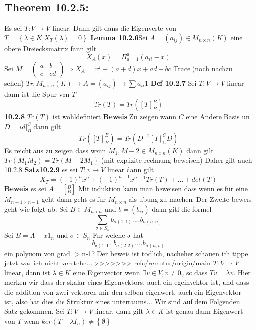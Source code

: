 \documentclass{article}
\begin{document}
\subsection{Theorem 10.2.5:} Es sei $T:V\rightarrow V$ linear. Dann gilt dans die Eigenverte von $T=\left\lbrace\lambda \in K|X_T(\lambda)=0\right\rbrace$
\newline
\textbf{Lemma 10.2.6}Sei $A=(a_{ij})\in M_{n\times n}(K)$ eine obere Dreiecksmatrix fann gilt \[X_A(x)=\Pi_{n=1}^n(a_{ii}-x)\]
Sei $M=\begin{pmatrix}a&b\\c&cd\end{pmatrix} \Rightarrow X_A=x^2-(a+d)x+ad-bc$\newline
 Trace (noch nachzu sehen) $Tr:M_{n\times n}(K)\rightarrow A=(a_{ij})\rightarrow\sum a_{ii}1$
\textbf{Def 10.2.7} Sei $T:V\rightarrow V$ linear dann ist die Spur von $T$ \[Tr(T)=Tr([T]^B_B)\]
\textbf{10.2.8} $Tr(T)$ ist wohldefiniert
\newline\textbf{Beweis} Zu zeigen wann $C$ eine Andere Basis un $D=id]^C_B$ dann gilt \[Tr([T]^B_B)=Tr(D^{-1}[T]^C_CD)\]
Es reicht aus zu zeigen dass wenn $M_1,M-2\in M_{n\times n}(K)$ dann gilt $Tr(M_1M_2)=Tr(M-2M_1)$ (mit explizite rechnung beweisen)\newline
Daher gilt auch 10.2.8\newline
\textbf{Satz10.2.9} es sei $T:v\rightarrow V$ linear dann gilt \[X_T=(-1)^nx^n+(-1)^{n-1}x^{n-1}Tr(T)+...+det(T)\]
\textbf{Beweis} es sei $A=[^B_B]$ Mit induktion kann man beweisen dass wenn es für eine $M_{n-1\times n-1}$ geht dann geht es für $M_{n\times n}$ als übung  zu machen.
Der Zweite beweis geht wie folgt ab:
\newline
Sei $B\in M_{n\times n}$ und $b=(b_{ij})$ dann gitl die formel
\[\sum_{\sigma\in S_n}b_{\sigma(1,1)}....b_{\sigma(n,n)}\]
Sei $B=A-x1_n$ und $\sigma\in S_n$ Fur welche $\sigma$ hat \[b_{\sigma(1,1)}b_{\sigma(2,2)}....b_{\sigma(n,n)}\] ein polynom von grad $>$n-1?
Der beweis ist todlich, nacheher schauen ich tippe jetzt was ich nicht verstehe...
\newline
>>>>>>> refs/remotes/origin/main
$T:V\rightarrow V$ linear, dann ist $\lambda \in K$ eine Eigenvector wenn $\exists v\in V,v\neq 0_v$ so dass $Tv=\lambda v$. Hier merken wir dass der skalar eines Eigenvektors, auch ein egeinvektor ist, und dass die addition von zwei vektoren mir den selben eigenwert, auch ein Eigenvektor ist, also hat dies die Struktur eines unterraums...\newline
Wir sind auf dem Folgenden Satz gekommen. Sei $T:V\rightarrow V$ linear, dann gilt $\lambda \in K$ ist genau dann Eigenwert von $T$ wenn $ker(T-\lambda I_n)\neq\left\lbrace\emptyset\right\rbrace$\newline
\end{document}
